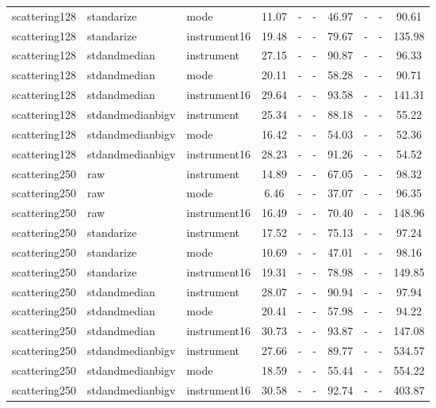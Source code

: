 \begin{table}
\begin{center}
\begin{tabular}{lllccccccc}
scattering128 & standarize & mode & 11.07 &   - &   - & 46.97 &   - &   - &     90.61 \\ 
scattering128 & standarize & instrument16 & 19.48 &   - &   - & 79.67 &   - &   - &    135.98 \\ 
scattering128 & stdandmedian & instrument & 27.15 &   - &   - & 90.87 &   - &   - &     96.33 \\ 
scattering128 & stdandmedian & mode & 20.11 &   - &   - & 58.28 &   - &   - &     90.71 \\ 
scattering128 & stdandmedian & instrument16 & 29.64 &   - &   - & 93.58 &   - &   - &    141.31 \\ 
scattering128 & stdandmedianbigv & instrument & 25.34 &   - &   - & 88.18 &   - &   - &     55.22 \\ 
scattering128 & stdandmedianbigv & mode & 16.42 &   - &   - & 54.03 &   - &   - &     52.36 \\ 
scattering128 & stdandmedianbigv & instrument16 & 28.23 &   - &   - & 91.26 &   - &   - &     54.52 \\ 
scattering250 & raw & instrument & 14.89 &   - &   - & 67.05 &   - &   - &     98.32 \\ 
scattering250 & raw & mode &  6.46 &   - &   - & 37.07 &   - &   - &     96.35 \\ 
scattering250 & raw & instrument16 & 16.49 &   - &   - & 70.40 &   - &   - &    148.96 \\ 
scattering250 & standarize & instrument & 17.52 &   - &   - & 75.13 &   - &   - &     97.24 \\ 
scattering250 & standarize & mode & 10.69 &   - &   - & 47.01 &   - &   - &     98.16 \\ 
scattering250 & standarize & instrument16 & 19.31 &   - &   - & 78.98 &   - &   - &    149.85 \\ 
scattering250 & stdandmedian & instrument & 28.07 &   - &   - & 90.94 &   - &   - &     97.94 \\ 
scattering250 & stdandmedian & mode & 20.41 &   - &   - & 57.98 &   - &   - &     94.22 \\ 
scattering250 & stdandmedian & instrument16 & 30.73 &   - &   - & 93.87 &   - &   - &    147.08 \\ 
scattering250 & stdandmedianbigv & instrument & 27.66 &   - &   - & 89.77 &   - &   - &    534.57 \\ 
scattering250 & stdandmedianbigv & mode & 18.59 &   - &   - & 55.44 &   - &   - &    554.22 \\ 
scattering250 & stdandmedianbigv & instrument16 & 30.58 &   - &   - & 92.74 &   - &   - &    403.87 \\ 

\end{tabular}
\end{center}
\end{table}

